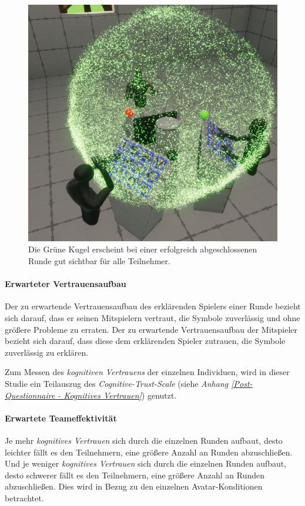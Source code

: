 \documentclass[a4paper,11pt]{article}%
\renewcommand{\\}{\vspace*{0.5\baselineskip} \newline}
\begin{document}
\begin{figure}[H]
		\begin{footnotesize}
		\centering
			\includegraphics[scale=0.2]{Abbildungen/RoundSuccsessful.JPG}	
			\caption[Der Abschluss einer Runde]{Die Grüne Kugel erscheint bei einer erfolgreich abgeschlossenen Runde gut sichtbar für alle Teilnehmer.}
			\label{RoundFinished}
		\end{footnotesize}
	\end{figure}
	
\paragraph{Erwarteter Vertrauensaufbau}
Der zu erwartende Vertrauensaufbau des erklärenden Spielers einer Runde bezieht sich darauf, dass er seinen Mitspielern vertraut, die Symbole zuverlässig und ohne größere Probleme zu erraten. Der zu erwartende Vertrauensaufbau der Mitspieler bezieht sich darauf, dass diese dem erklärenden Spieler zutrauen, die Symbole zuverlässig zu erklären.

Zum Messen des \textit{kognitiven Vertrauens} der einzelnen Individuen, wird in dieser Studie ein Teilauszug des \textit{Cognitive-Trust-Scale} \citep[S. 37]{mcallister1995affect} (siehe \textit{Anhang \ref{Post-Questionnaire - Kognitives Vertrauen}}) genutzt.

\paragraph{Erwartete Teameffektivität}
Je mehr \textit{kognitives Vertrauen} sich durch die einzelnen Runden aufbaut, desto leichter fällt es den Teilnehmern, eine größere Anzahl an Runden abzuschließen. Und je weniger \textit{kognitives Vertrauen} sich durch die einzelnen Runden aufbaut, desto schwerer fällt es den Teilnehmern, eine größere Anzahl an Runden abzuschließen. Dies wird in Bezug zu den einzelnen Avatar-Konditionen betrachtet.
\end{document}
